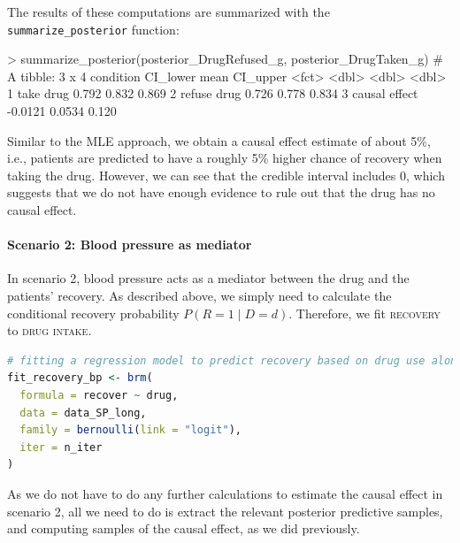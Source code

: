 \documentclass[nobib]{tufte-handout}
\newcommand{\ri}[1]{\mbox{\lstinline{#1}}\xspace}  %
\begin{document}
\vspace{-0.5cm}
The results of these computations are summarized with the \ri{summarize_posterior} function:

\begin{minipage}[]{\textwidth}
\begin{rc}
> summarize_posterior(posterior_DrugRefused_g,
                      posterior_DrugTaken_g)
# A tibble: 3 x 4
  condition     CI_lower   mean CI_upper
  <fct>            <dbl>  <dbl>    <dbl>
1 take drug       0.792  0.832     0.869
2 refuse drug     0.726  0.778     0.834
3 causal effect  -0.0121 0.0534    0.120
\end{rc}
\end{minipage}

\vspace{-0.5cm}
Similar to the MLE approach, we obtain a causal effect estimate of about 5\%, i.e., patients are predicted to have a roughly 5\% higher chance of recovery when taking the drug.
However, we can see that the credible interval includes 0, which suggests that we do not have enough evidence to rule out that the drug has no causal effect.

\paragraph{Scenario 2: Blood pressure as mediator}
In scenario 2, blood pressure acts as a mediator between the drug and the patients’ recovery.
As described above, we simply need to calculate the conditional recovery probability $P(R=1 \mid D=d)$.
Therefore, we fit \textsc{recovery} to \textsc{drug intake}.

\begin{minipage}[]{\textwidth}
\begin{lstlisting}[language=R]
# fitting a regression model to predict recovery based on drug use alone
fit_recovery_bp <- brm(
  formula = recover ~ drug,
  data = data_SP_long,
  family = bernoulli(link = "logit"),
  iter = n_iter
)
\end{lstlisting}
\end{minipage}

\vspace{-0.5cm}
As we do not have to do any further calculations to estimate the causal effect in scenario 2, all we need to do is extract the relevant posterior predictive samples, and computing samples of the causal effect, as we did previously.
\end{document}
